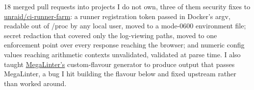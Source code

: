 \descript{ }
18 merged pull requests into projects I do not own, three of them security fixes to \href{https://github.com/unraid/ci-runner-farm}{unraid/ci-runner-farm}: a runner registration token passed in Docker's argv, readable out of /proc by any local user, moved to a mode-0600 environment file; secret redaction that covered only the log-viewing paths, moved to one enforcement point over every response reaching the browser; and numeric config values reaching arithmetic contexts unvalidated, validated at parse time. I also taught \href{https://github.com/oxsecurity/megalinter/pull/8686}{MegaLinter's} custom-flavour generator to produce output that passes MegaLinter, a bug I hit building the flavour below and fixed upstream rather than worked around.
\sectionsep{}

